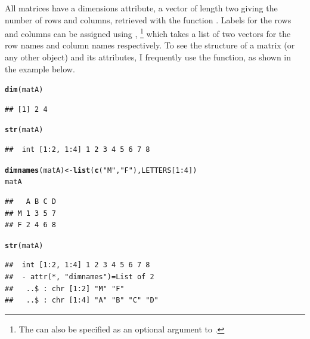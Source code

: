 \documentclass[11pt]{book}\usepackage[]{graphicx}\usepackage[]{color}
\makeatletter
\newcommand{\hlnum}[1]{\textcolor[rgb]{0.686,0.059,0.569}{#1}}%
\newcommand{\hlstr}[1]{\textcolor[rgb]{0.192,0.494,0.8}{#1}}%
\newcommand{\hlopt}[1]{\textcolor[rgb]{0,0,0}{#1}}%
\newcommand{\hlstd}[1]{\textcolor[rgb]{0.345,0.345,0.345}{#1}}%
\newcommand{\hlkwb}[1]{\textcolor[rgb]{0.69,0.353,0.396}{#1}}%
\newcommand{\hlkwd}[1]{\textcolor[rgb]{0.737,0.353,0.396}{\textbf{#1}}}%
\newenvironment{kframe}{%
 \def\at@end@of@kframe{}%
 \ifinner\ifhmode%
  \def\at@end@of@kframe{\end{minipage}}%
  \begin{minipage}{\columnwidth}%
 \fi\fi%
 \def\FrameCommand##1{\hskip\@totalleftmargin \hskip-\fboxsep
 \colorbox{shadecolor}{##1}\hskip-\fboxsep
     \hskip-\linewidth \hskip-\@totalleftmargin \hskip\columnwidth}%
 \MakeFramed {\advance\hsize-\width
   \@totalleftmargin\z@ \linewidth\hsize
   \@setminipage}}%
 {\par\unskip\endMakeFramed%
 \at@end@of@kframe}
\newenvironment{knitrout}{}{} %
\renewenvironment{knitrout}{\small\renewcommand{\baselinestretch}{.85}}{} %
\makeatother
\begin{document}
All matrices have a dimensions attribute, a vector of length two giving the number
of rows and columns, retrieved with the function . Labels for the rows and
columns can be assigned using ,%
\footnote{
The  can also be specified as an optional argument to .
}
which takes a list of two vectors for the
row names and column names respectively. To see the structure of a matrix
(or any other \R object) and its attributes, I frequently use the  function,
as shown in the example below.

\begin{knitrout}
\color{fgcolor}\begin{kframe}
\begin{alltt}
\hlkwd{dim}\hlstd{(matA)}
\end{alltt}
\begin{verbatim}
## [1] 2 4
\end{verbatim}
\begin{alltt}
\hlkwd{str}\hlstd{(matA)}
\end{alltt}
\begin{verbatim}
##  int [1:2, 1:4] 1 2 3 4 5 6 7 8
\end{verbatim}
\begin{alltt}
\hlkwd{dimnames}\hlstd{(matA)} \hlkwb{<-} \hlkwd{list}\hlstd{(}\hlkwd{c}\hlstd{(}\hlstr{"M"}\hlstd{,}\hlstr{"F"}\hlstd{), LETTERS[}\hlnum{1}\hlopt{:}\hlnum{4}\hlstd{])}
\hlstd{matA}
\end{alltt}
\begin{verbatim}
##   A B C D
## M 1 3 5 7
## F 2 4 6 8
\end{verbatim}
\begin{alltt}
\hlkwd{str}\hlstd{(matA)}
\end{alltt}
\begin{verbatim}
##  int [1:2, 1:4] 1 2 3 4 5 6 7 8
##  - attr(*, "dimnames")=List of 2
##   ..$ : chr [1:2] "M" "F"
##   ..$ : chr [1:4] "A" "B" "C" "D"
\end{verbatim}
\end{kframe}
\end{knitrout}
\end{document}
